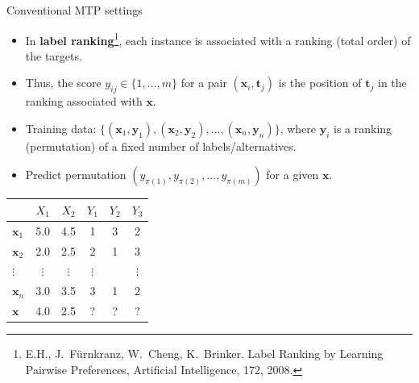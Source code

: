 \documentclass[]{beamer}
\newcommand{\bx}{\boldsymbol{x}}
\newcommand{\by}{\boldsymbol{y}}
\renewcommand{\emph}[1]{\textbf{\color{putblue}#1}}
\begin{document}
\begin{frame}{Conventional MTP settings}
\begin{itemize}
\item
In \emph{label ranking}\footnote{E.H., J.\ F\"urnkranz, W.\ Cheng, K.\ Brinker. Label Ranking by Learning Pairwise Preferences, Artificial Intelligence, 172, 2008.}, each instance is associated with a ranking (total order) of the targets.
\item 
Thus, the score $y_{ij} \in \{1,...,m\}$ for a pair $(\bx_i, \boldsymbol{t}_j)$ is the position of $\boldsymbol{t}_j$ in the ranking associated with $\bx$.

\item Training data: $\{(\bx_1,\by_1), (\bx_2,\by_2), \ldots, (\bx_n,\by_n)\} $, where $\by_i$ is a ranking (permutation) of a fixed number of labels/alternatives.
 
\item Predict permutation $(y_{\pi(1)}, y_{\pi(2)}, \ldots, y_{\pi(m)})$  for a given $\bx$. 
\end{itemize}

\vskip6pt

\begin{minipage}[c][4cm][c]{\textwidth}
\begin{center}
\begin{tabular}{lcc@{$\qquad$} ccc}
\toprule
& $X_1$ & $X_2$ & $Y_1$ & $Y_2$ & $Y_3$ \\
\midrule
$\bx_1$ & 5.0 & 4.5 & 1 & 3 &  2 \\
$\bx_2$ & 2.0 & 2.5 & 2 & 1 &  3 \\
$\vdots$ & $\vdots$ & $\vdots$ & $\vdots$ & & $\vdots$ \\
$\bx_n$ & 3.0 & 3.5 & 3 & 1 & 2 \\
\midrule
$\bx$  
& 4.0 & 2.5 & ? & ? & ?\\
 \bottomrule
\end{tabular}
\end{center}
\end{minipage}
% 

\end{frame}
\end{document}
